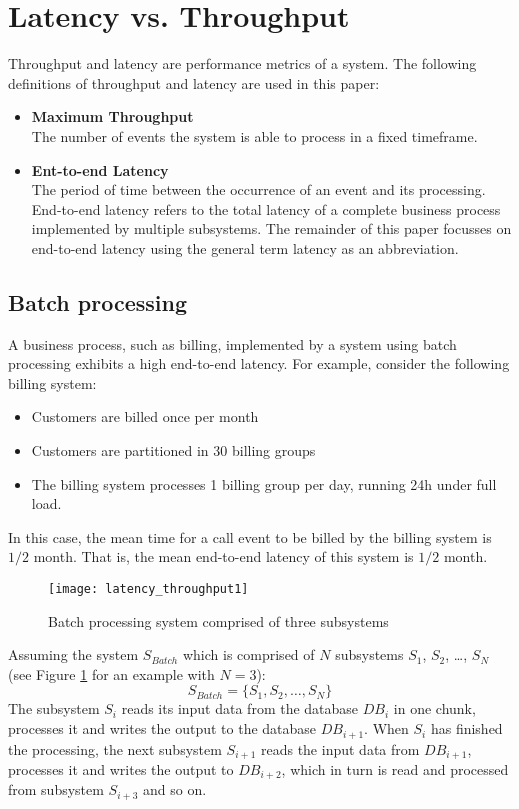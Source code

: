 \section{Latency vs. Throughput}\label{sec:latency_throughput}
Throughput and latency are performance metrics of a system. The following definitions of throughput and latency are used in this paper:
\begin{itemize}
	\item \textbf{Maximum Throughput}\\
	The number of events the system is able to process in a fixed timeframe.
 	\item \textbf{Ent-to-end Latency}\\
	The period of time between the occurrence of an event and its processing. End-to-end latency refers to the total latency of a complete business process implemented by multiple subsystems. The remainder of this paper focusses on end-to-end latency using the general term latency as an abbreviation.
\end{itemize}
\subsection{Batch processing}
A business process, such as billing, implemented by a system using batch processing exhibits a high end-to-end latency. For example, consider the following billing system:
\begin{itemize}
	\item Customers are billed once per month
	\item Customers are partitioned in 30 billing groups
	\item The billing system processes 1 billing group per day, running 24h under full load.
\end{itemize}

In this case, the mean time for a call event to be billed by the billing system is $1/2$ month. That is, the mean end-to-end latency of this system is $1/2$ month.

\begin{figure}[h!]
	\centering
	\texttt{[image: latency\_throughput1]}
	\caption{Batch processing system comprised of three subsystems}
	\label{fig:batch_processing_latency}
\end{figure}

Assuming the system $S_{Batch}$ which is comprised of $N$ subsystems $S_1$, $S_2$, \ldots, $S_N$ (see Figure \ref{fig:batch_processing_latency} for an example with $N=3$):
\begin{displaymath}
S_{Batch} = \{S_1, S_2, \ldots, S_N\}
\end{displaymath}
The subsystem $S_i$ reads its input data from the database $DB_i$ in one chunk, processes it and writes the output to the database $DB_{i+1}$. When $S_i$ has finished the processing, the next subsystem $S_{i+1}$ reads the input data from $DB_{i+1}$, processes it and writes the output to $DB_{i+2}$, which in turn is read and processed from subsystem $S_{i+3}$ and so on.

